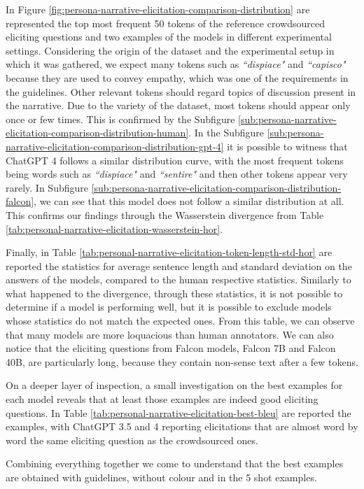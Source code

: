 In Figure \ref{fig:persona-narrative-elicitation-comparison-distribution} are represented the top most frequent 50 tokens of the reference crowdsourced eliciting questions and two examples of the models in different experimental settings. Considering the origin of the dataset and the experimental setup in which it was gathered, we expect many tokens such as \emph{``dispiace"} and \emph{``capisco"} because they are used to convey empathy, which was one of the requirements in the guidelines. Other relevant tokens should regard topics of discussion present in the narrative. Due to the variety of the dataset, most tokens should appear only once or few times. This is confirmed by the Subfigure \ref{sub:persona-narrative-elicitation-comparison-distribution-human}. 
In the Subfigure \ref{sub:persona-narrative-elicitation-comparison-distribution-gpt-4} it is possible to witness that ChatGPT 4 follows a similar distribution curve, with the most frequent tokens being words such as \emph{``dispiace"} and \emph{``sentire"} and then other tokens appear very rarely. 
In Subfigure \ref{sub:persona-narrative-elicitation-comparison-distribution-falcon}, we can see that this model does not follow a similar distribution at all. This confirms our findings through the Wasserstein divergence from Table \ref{tab:personal-narrative-elicitation-wasserstein-hor}.

% 
Finally, in Table \ref{tab:personal-narrative-elicitation-token-length-std-hor} are reported the statistics for average sentence length and standard deviation on the answers of the models, compared to the human respective statistics. Similarly to what happened to the divergence, through these statistics, it is not possible to determine if a model is performing well, but it is possible to exclude models whose statistics do not match the expected ones.  From this table, we can observe that many models are more loquacious than human annotators. We can also notice that the eliciting questions from Falcon models, Falcon 7B and Falcon 40B, are particularly long, because they contain non-sense text after a few tokens.


On a deeper layer of inspection, a small investigation on the best examples for each model reveals that at least those examples are indeed good eliciting questions. In Table \ref{tab:personal-narrative-elicitation-best-bleu} are reported the examples, with ChatGPT 3.5 and 4 reporting elicitations that are almost word by word the same eliciting question as the crowdsourced ones.

Combining everything together we come to understand that the best examples are obtained with guidelines, without colour and in the 5 shot examples. %